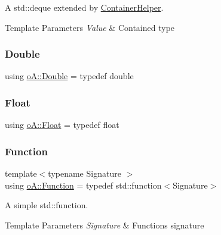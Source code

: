 A std\+::deque extended by \mbox{\hyperlink{classo_a_1_1_container_helper}{Container\+Helper}}. 


\begin{DoxyTemplParams}{Template Parameters}
{\em Value} & Contained type \\
\hline
\end{DoxyTemplParams}
\mbox{\label{namespaceo_a_a2bcc976232176d2dcf8b9df1fa33c038}} 
\subsubsection{\texorpdfstring{Double}{Double}}
{\footnotesize\ttfamily using \mbox{\hyperlink{namespaceo_a_a2bcc976232176d2dcf8b9df1fa33c038}{o\+A\+::\+Double}} = typedef double}

\mbox{\label{namespaceo_a_a513e9cb16924b482268ab3fcdf1f2499}} 
\subsubsection{\texorpdfstring{Float}{Float}}
{\footnotesize\ttfamily using \mbox{\hyperlink{namespaceo_a_a513e9cb16924b482268ab3fcdf1f2499}{o\+A\+::\+Float}} = typedef float}

\mbox{\label{namespaceo_a_a85bea86b9d05d2b86c77d8ee5b7bbde5}} 
\subsubsection{\texorpdfstring{Function}{Function}}
{\footnotesize\ttfamily template$<$typename Signature $>$ \\
using \mbox{\hyperlink{namespaceo_a_a85bea86b9d05d2b86c77d8ee5b7bbde5}{o\+A\+::\+Function}} = typedef std\+::function$<$Signature$>$}



A simple std\+::function. 


\begin{DoxyTemplParams}{Template Parameters}
{\em Signature} & Function\textquotesingle{}s signature \\
\hline
\end{DoxyTemplParams}
\mbox{\label{namespaceo_a_a5cea26f1078da3e5c2fc4529d6459c94}} 

